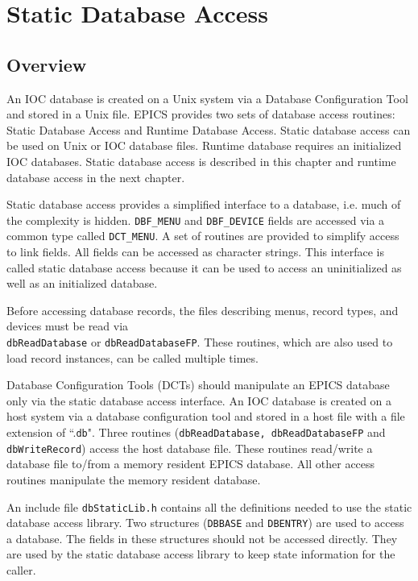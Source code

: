 \chapter{Static Database Access}

\section{Overview}

An IOC database is created on a Unix system via a Database Configuration Tool and stored in a Unix file. EPICS provides 
two sets of database access routines: Static Database Access and Runtime Database Access. Static database access can be 
used on Unix or IOC database files. Runtime database requires an initialized IOC databases. Static database access is 
described in this chapter and runtime database access in the next chapter.

Static database access provides a simplified interface to a database, i.e. much of the complexity is hidden. \verb|DBF_MENU| and 
\verb|DBF_DEVICE| fields are accessed via a common type called \verb|DCT_MENU|. A set of routines are provided to simplify access 
to link fields. All fields can be accessed as character strings. This interface is called static database access because it can 
be used to access an uninitialized as well as an initialized database.

Before accessing database records, the files describing menus, record types, and devices must be read via \\
\verb|dbReadDatabase| or \verb|dbReadDatabaseFP|. These routines, which are also used to load record instances, can be 
called multiple times.

Database Configuration Tools (DCTs) should manipulate an EPICS database only via the static database access interface. 
An IOC database is created on a host system via a database configuration tool and stored in a host file with a file 
extension of ``.\verb|db|". Three routines (\verb|dbReadDatabase, dbReadDatabaseFP| and \verb|dbWriteRecord|) access the 
host database file. These routines read/write a database file to/from a memory resident EPICS database. All other access 
routines manipulate the memory resident database.

An include file \verb|dbStaticLib.h| contains all the definitions needed to use the static database access library. Two 
structures (\verb|DBBASE| and \verb|DBENTRY|) are used to access a database. The fields in these structures should not be accessed 
directly. They are used by the static database access library to keep state information for the caller.


